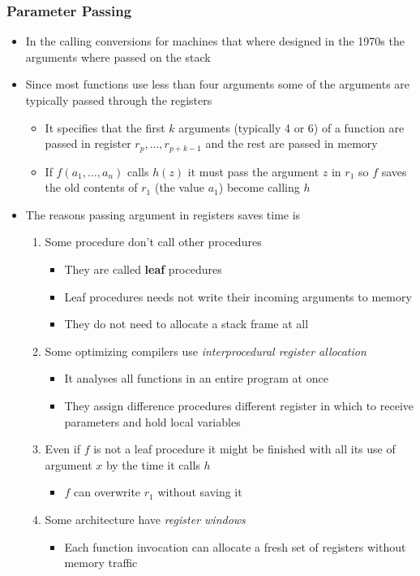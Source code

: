 \documentclass[11pt]{article}
\begin{document}
\subsubsection{Parameter Passing}
\label{sec:org0ba1617}
\begin{itemize}
\item In the calling conversions for machines that where designed in the 1970s the arguments where passed on the stack
\item Since most functions use less than four arguments some of the arguments are typically passed through the registers
\begin{itemize}
\item It specifies that the first \(k\) arguments (typically 4 or 6) of a function are passed in register \(r_p, \dots, r_{p+k-1}\) and the rest are passed in memory
\item If \(f(a_1, \dots, a_n)\) calls \(h(z)\) it must pass the argument \(z\) in \(r_1\) so \(f\) saves the old contents of \(r_1\) (the value \(a_1\)) become calling \(h\)
\end{itemize}

\item The reasons passing argument in registers saves time is
\begin{enumerate}
\item Some procedure don't call other procedures
\begin{itemize}
\item They are called \textbf{leaf} procedures
\item Leaf procedures needs not write their incoming arguments to memory
\item They do not need to allocate a stack frame at all
\end{itemize}
\item Some optimizing compilers use \emph{interprocedural register allocation}
\begin{itemize}
\item It analyses all functions in an entire program at once
\item They assign difference procedures different register in which to receive parameters and hold local variables
\end{itemize}
\item Even if \(f\) is not a leaf procedure it might be finished with all its use of argument \(x\) by the time it calls \(h\)
\begin{itemize}
\item \(f\) can overwrite \(r_1\) without saving it
\end{itemize}
\item Some architecture have \emph{register windows}
\begin{itemize}
\item Each function invocation can allocate a fresh set of registers without memory traffic
\end{itemize}
\end{enumerate}


\end{itemize}
\end{document}
